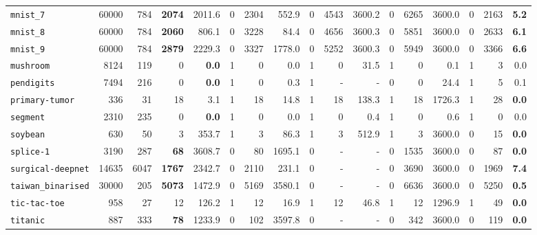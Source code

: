 \begin{tabular}{lccrrrrrrrrrrrrrr}
\texttt{mnist\_7} & \multicolumn{1}{r}{60000} & \multicolumn{1}{r}{784}  & \textbf{2074} & 2011.6 & 0 & 2304 & 552.9 & 0 & 4543 & 3600.2 & 0 & 6265 & 3600.0 & 0 & 2163 & \textbf{5.2}\\
\texttt{mnist\_8} & \multicolumn{1}{r}{60000} & \multicolumn{1}{r}{784}  & \textbf{2060} & 806.1 & 0 & 3228 & 84.4 & 0 & 4656 & 3600.3 & 0 & 5851 & 3600.0 & 0 & 2633 & \textbf{6.1}\\
\texttt{mnist\_9} & \multicolumn{1}{r}{60000} & \multicolumn{1}{r}{784}  & \textbf{2879} & 2229.3 & 0 & 3327 & 1778.0 & 0 & 5252 & 3600.3 & 0 & 5949 & 3600.0 & 0 & 3366 & \textbf{6.6}\\
\texttt{mushroom} & \multicolumn{1}{r}{8124} & \multicolumn{1}{r}{119}  & 0 & \textbf{0.0} & 1 & 0 & 0.0 & 1 & 0 & 31.5 & 1 & 0 & 0.1 & 1 & 3 & 0.0\\
\texttt{pendigits} & \multicolumn{1}{r}{7494} & \multicolumn{1}{r}{216}  & 0 & \textbf{0.0} & 1 & 0 & 0.3 & 1 & - & - & 0 & 0 & 24.4 & 1 & 5 & 0.1\\
\texttt{primary-tumor} & \multicolumn{1}{r}{336} & \multicolumn{1}{r}{31}  & 18 & 3.1 & 1 & 18 & 14.8 & 1 & 18 & 138.3 & 1 & 18 & 1726.3 & 1 & 28 & \textbf{0.0}\\
\texttt{segment} & \multicolumn{1}{r}{2310} & \multicolumn{1}{r}{235}  & 0 & \textbf{0.0} & 1 & 0 & 0.0 & 1 & 0 & 0.4 & 1 & 0 & 0.6 & 1 & 0 & 0.0\\
\texttt{soybean} & \multicolumn{1}{r}{630} & \multicolumn{1}{r}{50}  & 3 & 353.7 & 1 & 3 & 86.3 & 1 & 3 & 512.9 & 1 & 3 & 3600.0 & 0 & 15 & \textbf{0.0}\\
\texttt{splice-1} & \multicolumn{1}{r}{3190} & \multicolumn{1}{r}{287}  & \textbf{68} & 3608.7 & 0 & 80 & 1695.1 & 0 & - & - & 0 & 1535 & 3600.0 & 0 & 87 & \textbf{0.0}\\
\texttt{surgical-deepnet} & \multicolumn{1}{r}{14635} & \multicolumn{1}{r}{6047}  & \textbf{1767} & 2342.7 & 0 & 2110 & 231.1 & 0 & - & - & 0 & 3690 & 3600.0 & 0 & 1969 & \textbf{7.4}\\
\texttt{taiwan\_binarised} & \multicolumn{1}{r}{30000} & \multicolumn{1}{r}{205}  & \textbf{5073} & 1472.9 & 0 & 5169 & 3580.1 & 0 & - & - & 0 & 6636 & 3600.0 & 0 & 5250 & \textbf{0.5}\\
\texttt{tic-tac-toe} & \multicolumn{1}{r}{958} & \multicolumn{1}{r}{27}  & 12 & 126.2 & 1 & 12 & 16.9 & 1 & 12 & 46.8 & 1 & 12 & 1296.9 & 1 & 49 & \textbf{0.0}\\
\texttt{titanic} & \multicolumn{1}{r}{887} & \multicolumn{1}{r}{333}  & \textbf{78} & 1233.9 & 0 & 102 & 3597.8 & 0 & - & - & 0 & 342 & 3600.0 & 0 & 119 & \textbf{0.0}\\

\end{tabular}
